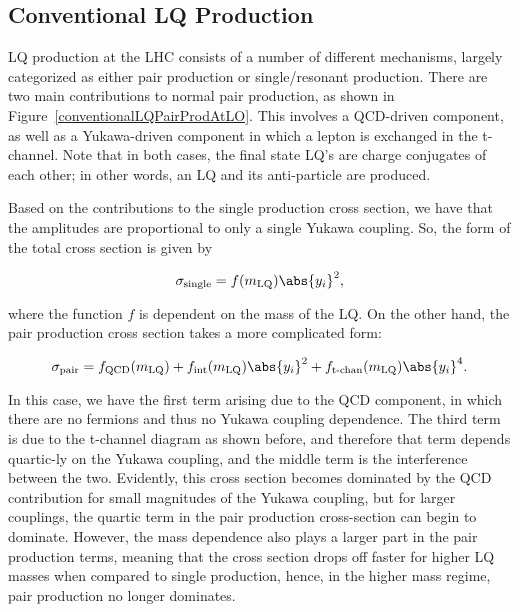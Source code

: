     \subsection{Conventional LQ Production}
        LQ production at the LHC consists of a number of different mechanisms, largely categorized as either pair production or single/resonant production. There are two main contributions to normal pair production, as shown in Figure~\ref{conventionalLQPairProdAtLO}. This involves a QCD-driven component, as well as a Yukawa-driven component in which a lepton is exchanged in the t-channel. Note that in both cases, the final state LQ's are charge conjugates of each other; in other words, an LQ and its anti-particle are produced. 
        
        
        Based on the contributions to the single production cross section, we have that the amplitudes are proportional to only a single Yukawa coupling. So, the form of the total cross section is given by

        \begin{equation}
            \sigma_{\text{single}} = f(m_{\text{LQ}}) \abs{y_i}^2,
        \end{equation}

        where the function $f$ is dependent on the mass of the LQ. On the other hand, the pair production cross section takes a more complicated form:

        \begin{equation}
            \sigma_{\text{pair}} = f_{\text{QCD}}(m_{\text{LQ}}) + f_{\text{int}}(m_{\text{LQ}}) \abs{y_i}^2 + f_{\text{t-chan}}(m_{\text{LQ}}) \abs{y_i}^4. 
        \end{equation}

        In this case, we have the first term arising due to the QCD component, in which there are no fermions and thus no Yukawa coupling dependence. The third term is due to the t-channel diagram as shown before, and therefore that term depends quartic-ly on the Yukawa coupling, and the middle term is the interference between the two. Evidently, this cross section becomes dominated by the QCD contribution for small magnitudes of the Yukawa coupling, but for larger couplings, the quartic term in the pair production cross-section can begin to dominate. However, the mass dependence also plays a larger part in the pair production terms, meaning that the cross section drops off faster for higher LQ masses when compared to single production, hence, in the higher mass regime, pair production no longer dominates.
